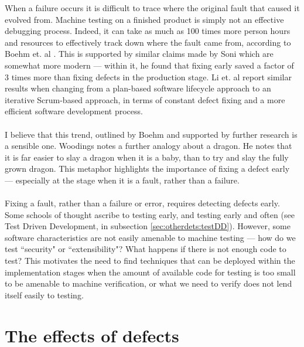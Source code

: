 When a failure occurs it is difficult to trace where the original fault that caused it evolved from.
Machine testing on a finished product is simply not an effective debugging process.
Indeed, it can take as much as 100 times more person hours and resources to effectively track down
where the fault came from, according to Boehm et. al \cite{boehm2005foundations}.
This is supported by similar claims made by Soni \cite{soni2006defect} which are somewhat more
modern --- within it, he found that fixing early saved a factor of 3 times more than fixing defects
in the production stage.
Li et. al \cite{li2010transition} report similar results when changing from a plan-based software
lifecycle approach to an iterative Scrum-based approach, in terms of constant defect fixing and a
more efficient software development process.\\
\\
I believe that this trend, outlined by Boehm and supported by further research is a sensible one.
Woodings \cite{terryLecture4220} notes a further analogy about a dragon.
He notes that it is far easier to slay a dragon when it is a baby, than to try and slay the fully
grown dragon.
This metaphor highlights the importance of fixing a defect early --- especially at the stage when it
is a fault, rather than a failure.\\
\\
Fixing a fault, rather than a failure or error, requires detecting defects early.
Some schools of thought ascribe to testing early, and testing early and often (see Test Driven Development, in
subsection \ref{sec:otherdets:testDD}).
However, some software characteristics are not easily amenable to machine testing --- how do we test
``security" or ``extensibility"?
What happens if there is not enough code to test?
This motivates the need to find techniques that can be deployed within the implementation stages
when the amount of available code for testing is too small to be amenable to machine verification,
or what we need to verify does not lend itself easily to testing.

\section{The effects of defects} \label{sec:defects:defEffects}

